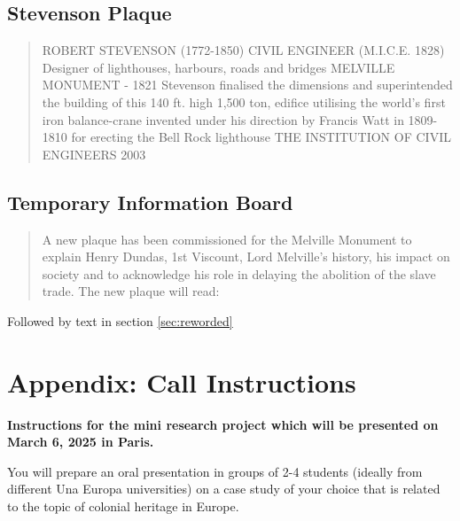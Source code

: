 \documentclass{scrartcl}
\begin{document}
\begin{appendices}
\subsection{Stevenson Plaque}\label{sec:stevenson}

\begin{quote}
ROBERT STEVENSON (1772-1850)
CIVIL ENGINEER (M.I.C.E. 1828)
Designer of lighthouses, harbours, roads and bridges
MELVILLE MONUMENT - 1821 Stevenson finalised the dimensions and superintended the building of this 140 ft. high 1,500 ton, edifice utilising the world's first iron balance-crane invented under
his direction by Francis Watt in 1809-1810 for erecting the Bell Rock lighthouse
THE INSTITUTION OF CIVIL ENGINEERS
2003
\end{quote}

\subsection{Temporary Information Board}\label{sec:temporary}


\begin{quote}
A new plaque has been commissioned for the Melville Monument to explain Henry Dundas, 1st Viscount, Lord Melville's history, his impact on society and to acknowledge his role in delaying the abolition of the slave trade.
The new plaque will read:
\end{quote}

Followed by text in section \ref{sec:reworded}

\begin{quote}

\end{quote}

\section{Appendix: Call Instructions}
\textbf{Instructions for the mini research project which will be presented on March 6, 2025 in Paris.}

You will prepare an oral presentation in groups of 2-4 students (ideally from different Una Europa universities) on a case study of your choice that is related to the topic of colonial heritage in Europe. 


\end{appendices}
\end{document}
